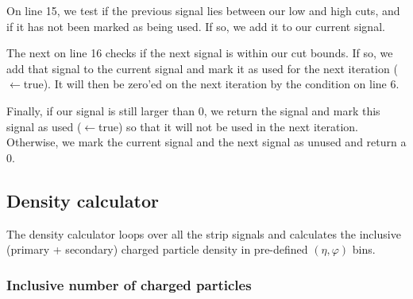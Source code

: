 \documentclass[11pt]{article}
\begin{document}
On line 15, we test if the previous signal lies between our low and
high cuts, and if it has not been marked as being used.  If so, we add
it to our current signal.  

The next  on line 16 checks if the next signal is within our
cut bounds.  If so, we add that signal to the current signal and mark
it as used for the next iteration ($\leftarrow$true).  It will then be zero'ed on the next
iteration by the condition on line 6.

Finally, if our signal is still larger than 0, we return the signal
and mark this signal as used ($\leftarrow$true) so that it will not be used in the next
iteration. Otherwise, we mark the current signal and the next signal
as unused and return a 0. 


\subsection{Density calculator}

The density calculator loops over all the strip signals and calculates
the inclusive (primary + secondary) charged particle density in
pre-defined $(\eta,\varphi)$ bins.  

\subsubsection{Inclusive number of charged particles} 
\end{document}
